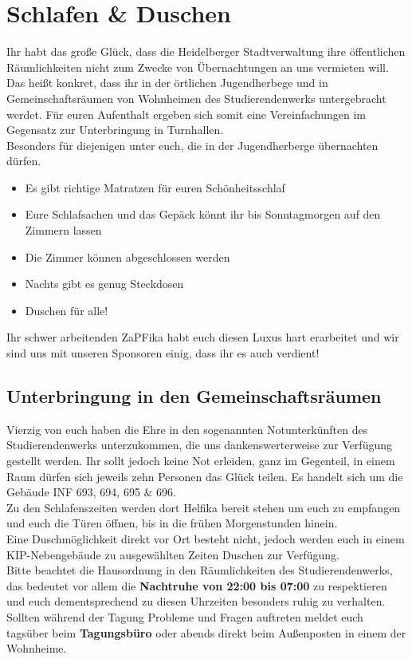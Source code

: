 
\section{Schlafen \& Duschen}
Ihr habt das große Glück, dass die Heidelberger Stadtverwaltung ihre öffentlichen Räumlichkeiten nicht zum Zwecke von Übernachtungen an uns vermieten will. Das heißt konkret, dass ihr in der örtlichen Jugendherbege und in Gemeinschaftsräumen von Wohnheimen des Studierendenwerks untergebracht werdet. Für euren Aufenthalt ergeben sich somit eine Vereinfachungen im Gegensatz zur Unterbringung in Turnhallen.\\
Besonders für diejenigen unter euch, die in der Jugendherberge übernachten dürfen.
\begin{itemize}
  \item Es gibt richtige Matratzen für euren Schönheitsschlaf
  \item Eure Schlafsachen und das Gepäck könnt ihr bis Sonntagmorgen auf den Zimmern lassen
  \item Die Zimmer können abgeschlossen werden
  \item Nachts gibt es genug Steckdosen
  \item Duschen für alle!
\end{itemize}
Ihr schwer arbeitenden ZaPFika habt euch diesen Luxus hart erarbeitet und wir sind uns mit unseren Sponsoren einig, dass ihr es auch verdient! \\

\subsection{Unterbringung in den Gemeinschaftsräumen}
Vierzig von euch haben die Ehre in den sogenannten Notunterkünften des Studierendenwerks unterzukommen, die uns dankenswerterweise zur Verfügung gestellt werden. 
Ihr sollt jedoch keine Not erleiden, ganz im Gegenteil, in einem Raum dürfen sich jeweils zehn Personen das Glück teilen. Es handelt sich um die Gebäude INF 693, 694, 695 \& 696.\\Zu den Schlafenszeiten werden dort Helfika bereit stehen um euch zu empfangen und euch die Türen öffnen, bis in die frühen Morgenstunden hinein.\\
Eine Duschmöglichkeit direkt vor Ort besteht nicht, jedoch werden euch in einem KIP-Nebengebäude zu ausgewählten Zeiten Duschen zur Verfügung.\\
Bitte beachtet die Hausordnung in den Räumlichkeiten des Studierendenwerks, das bedeutet vor allem die \textbf{Nachtruhe von 22:00 bis 07:00} zu respektieren und euch dementsprechend zu diesen Uhrzeiten besonders ruhig zu verhalten.\\
Sollten während der Tagung Probleme und Fragen auftreten meldet euch tagsüber beim  \textbf{Tagungsbüro} oder abends direkt beim Außenposten in einem der Wohnheime.

